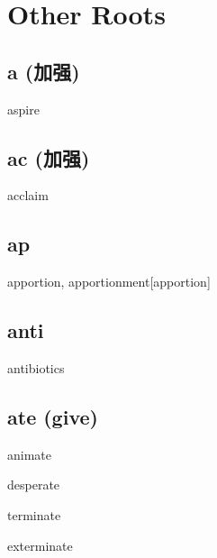 \chapter{Other Roots}

\section{a (加强)}

\begin{RefWord}{aspire}
\end{RefWord}

\section{ac (加强)}

\begin{RefWord}{acclaim}
\end{RefWord}

\section{ap}

\begin{RefWord}{apportion, apportionment}[apportion]
\end{RefWord}

\section{anti}

\begin{RefWord}{antibiotics}
\end{RefWord}

\section{ate (give)}

\begin{RefWord}{animate}
\end{RefWord}

\begin{RefWord}{desperate}
\end{RefWord}

\begin{RefWord}{terminate}
\end{RefWord}



\begin{RefWord}{exterminate}
\end{RefWord}

